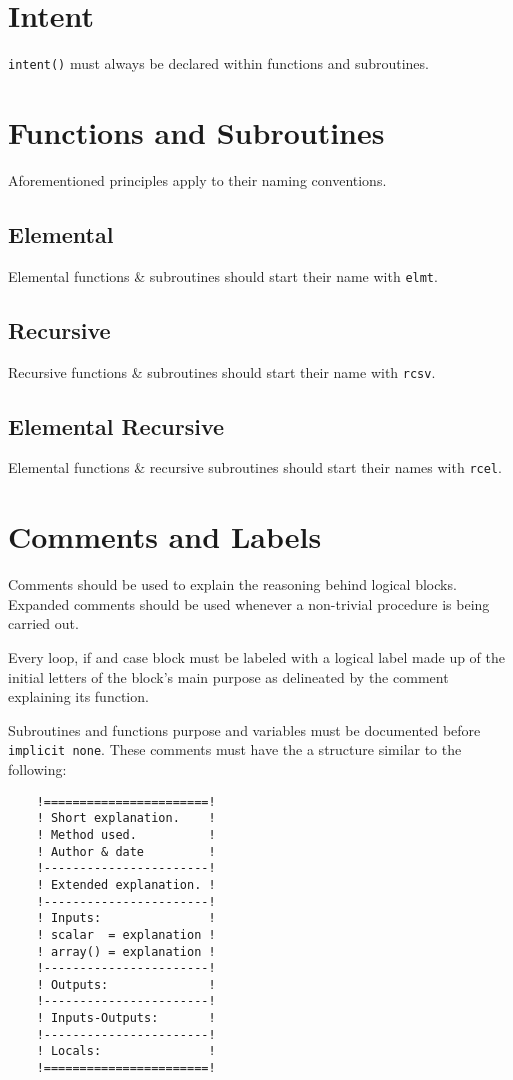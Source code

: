 \documentclass[11pt,a4paper]{article}
\begin{document}
	\section{Intent}
	\texttt{intent()} must always be declared within functions and subroutines. 
	\section{Functions and Subroutines}
	Aforementioned principles apply to their naming conventions.
		\subsection{Elemental}
		Elemental functions \& subroutines should start their name with \texttt{elmt\textunderscore}.
		\subsection{Recursive}
		Recursive functions \& subroutines should start their name with \texttt{rcsv\textunderscore}.
		\subsection{Elemental Recursive}
		Elemental functions \& recursive subroutines should start their names with \texttt{rcel\textunderscore}.
	\section{Comments and Labels}
	Comments should be used to explain the reasoning behind logical blocks. Expanded comments should be used whenever a non-trivial procedure is being carried out.
	
	Every loop, if and case block must be labeled with a logical label made up of the initial letters of the block's main purpose as delineated by the comment explaining its function.
	
	Subroutines and functions purpose and variables must be documented before \texttt{implicit none}. These comments must have the a structure similar to the following:
	\pagebreak
	\begin{verbatim}
    !=======================!
    ! Short explanation.    !
    ! Method used.          !
    ! Author & date         !
    !-----------------------!
    ! Extended explanation. !
    !-----------------------!
    ! Inputs:               !
    ! scalar  = explanation !
    ! array() = explanation !
    !-----------------------!
    ! Outputs:              !
    !-----------------------!
    ! Inputs-Outputs:       !
    !-----------------------!
    ! Locals:               !
    !=======================!
	\end{verbatim}
\end{document}
